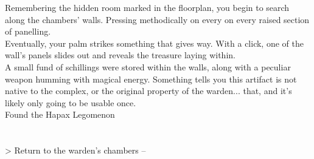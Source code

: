 Remembering the hidden room marked in the floorplan, you begin to search along the chambers' walls. Pressing methodically on every on every raised section of panelling.\\

Eventually, your palm strikes something that gives way. With a click, one of the wall’s panels slides out and reveals the treasure laying within.\\

A small fund of schillings were stored within the walls, along with a peculiar weapon humming with magical energy. Something tells you this artifact is not native to the complex, or the original property of the warden... that, and it's likely only going to be usable once.\\
 Found the Hapax Legomenon\\
\\
\\

> Return to the warden’s chambers -- 